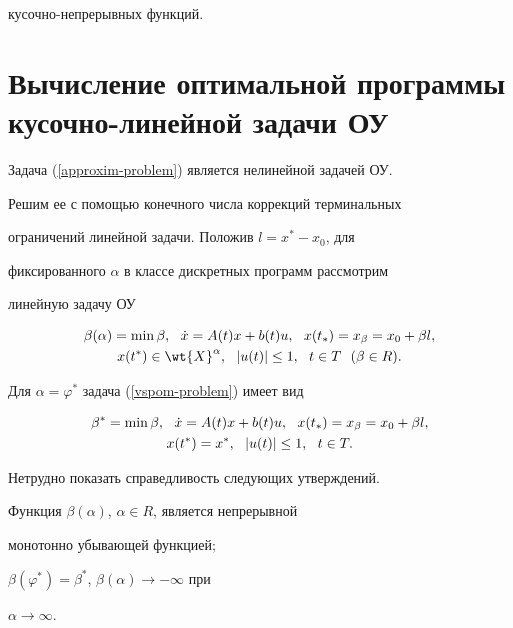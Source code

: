 кусочно-непрерывных функций.








\section{Вычисление оптимальной программы кусочно-линейной задачи ОУ}





Задача (\ref{approxim-problem}) является нелинейной задачей ОУ.


Решим ее с помощью конечного числа коррекций терминальных


ограничений линейной задачи. Положив $l=x^*-x_0$, для


фиксированного $\alpha$ в классе дискретных программ рассмотрим


линейную задачу ОУ


\begin{gather}\label{vspom-problem}


\beta(\alpha)=\min\beta,\ \ \Dot{x}=A(t)x+b(t)u,


\ \ x(t_*)=x_\beta=x_0+\beta l,\\


x(t^*)\in \wt{X}^\alpha,\ \ |u(t)|\leq1,\ \ t\in T\ \ (\beta\in R).\notag


\end{gather}





Для $\alpha=\varphi^*$ задача (\ref{vspom-problem}) имеет вид


\begin{gather}\label{vspom-problem-inval}


\beta^*=\min\beta,\ \ \Dot{x}=A(t)x+b(t)u,


\ \ x(t_*)=x_\beta=x_0+\beta l,\\


x(t^*)=x^*,\ \ |u(t)|\leq1,\ \ t\in T.\notag


\end{gather}





Нетрудно показать справедливость следующих утверждений.





\begin{lem}


Функция $\beta(\alpha)$, $\alpha\in R$, является непрерывной


монотонно убывающей функцией\/$;$


$\beta(\varphi^*)=\beta^*$, $\beta(\alpha)\rightarrow-\infty$ при


$\alpha\rightarrow\infty$.


\end{lem}





